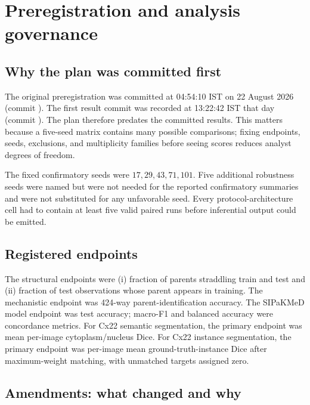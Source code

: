 \chapter{Preregistration and analysis governance}\label{s1:ch:ch03_preregistration_and_analysis_governance}

\section{Why the plan was committed first}

The original preregistration was committed at 04:54:10 IST on 22 August 2026 (commit ). The first result commit was recorded at 13:22:42 IST that day (commit ). The plan therefore predates the committed results. This matters because a five-seed matrix contains many possible comparisons; fixing endpoints, seeds, exclusions, and multiplicity families before seeing scores reduces analyst degrees of freedom.

The fixed confirmatory seeds were $17,29,43,71,101$. Five additional robustness seeds were named but were not needed for the reported confirmatory summaries and were not substituted for any unfavorable seed. Every protocol-architecture cell had to contain at least five valid paired runs before inferential output could be emitted.

\section{Registered endpoints}

The structural endpoints were (i) fraction of parents straddling train and test and (ii) fraction of test observations whose parent appears in training. The mechanistic endpoint was 424-way parent-identification accuracy. The SIPaKMeD model endpoint was test accuracy; macro-F1 and balanced accuracy were concordance metrics. For Cx22 semantic segmentation, the primary endpoint was mean per-image cytoplasm/nucleus Dice. For Cx22 instance segmentation, the primary endpoint was per-image mean ground-truth-instance Dice after maximum-weight matching, with unmatched targets assigned zero.

\section{Amendments: what changed and why}

